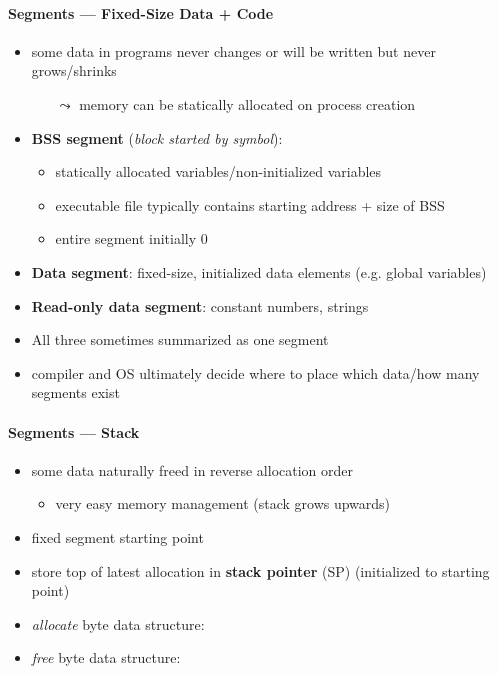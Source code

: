 \paragraph{Segments --- Fixed-Size Data + Code}
\begin{itemize}
	\item some data in programs never changes or will be written but never grows/shrinks
	\begin{itemize}
		\item[$ \leadsto $] memory can be statically allocated on process creation
	\end{itemize}
	\item \textbf{BSS segment} (\emph{block started by symbol}):
	\begin{itemize}
		\item statically allocated variables/non-initialized variables
		\item executable file typically contains starting address + size of BSS
		\item entire segment initially 0
	\end{itemize}
	\item \textbf{Data segment}: fixed-size, initialized data elements (e.g. global variables)
	\item \textbf{Read-only data segment}: constant numbers, strings
	\item All three sometimes summarized as one segment
	\item compiler and OS ultimately decide where to place which data/how many segments exist
\end{itemize}

\paragraph{Segments --- Stack}
\begin{itemize}
	\item some data naturally freed in reverse allocation order
	\begin{itemize}
		\item very easy memory management (stack grows upwards)
	\end{itemize}
	\item fixed segment starting point
	\item store top of latest allocation in \textbf{stack pointer} (SP) (initialized to starting point)
	\item \emph{allocate}  byte data structure: 
	\item \emph{free}  byte data structure: 
\end{itemize}

